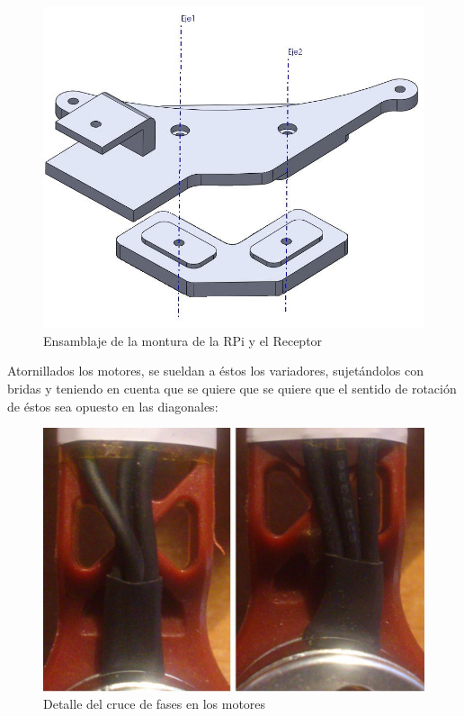 \documentclass[twoside,11pt]{book}
\begin{document}
\begin{figure}[h!]
\begin{center}
\includegraphics[scale=0.35,bb=0 0 700 500]{images/ensamblaje_rpi_mount.png}
\end{center}
\caption{Ensamblaje de la montura de la RPi y el Receptor}
\end{figure}

Atornillados los motores, se sueldan a éstos los variadores, sujetándolos con bridas y teniendo en cuenta que se quiere que se quiere que el sentido de rotación de éstos sea opuesto en las diagonales:\\

\begin{figure}[h!]
\begin{center}
\includegraphics[scale=0.15,bb=0 0 1050 700]{images/comp_motor_wires.png}
\end{center}
\caption{Detalle del cruce de fases en los motores}
\label{detalle_cable_motor}
\end{figure}
\end{document}
